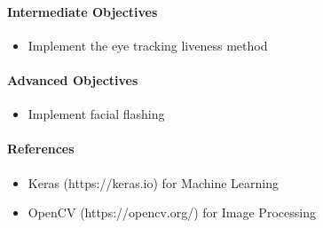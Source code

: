 \documentclass{article}
\begin{document}
    \paragraph{Intermediate Objectives}
        \begin{itemize}
            \item Implement the eye tracking liveness method
        \end{itemize}
    \paragraph{Advanced Objectives}
        \begin{itemize}
            \item Implement facial flashing
        \end{itemize}
    \paragraph{References}
        \begin{itemize}
            \item Keras (https://keras.io) for Machine Learning
            \item OpenCV (https://opencv.org/) for Image Processing
        \end{itemize}

   
\end{document}
